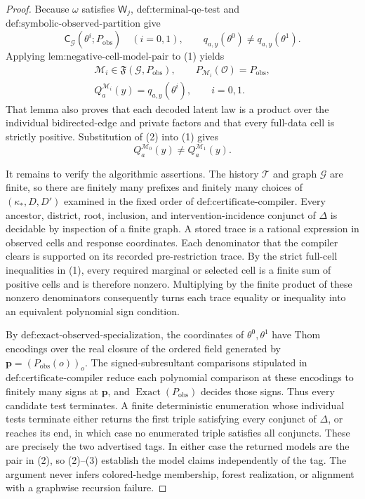 \documentclass{article}
\begin{document}
\begin{proof}
Because \(\omega\) satisfies \(\mathsf W_j\), \(\text{def:terminal-qe-test}\) and \(\text{def:symbolic-observed-partition}\) give
\[
\mathsf C_{\mathcal G}(\theta^i;P_{\mathrm{obs}})
\quad(i=0,1),
\qquad
q_{a,y}(\theta^0)\neq q_{a,y}(\theta^1).
\tag{1}
\]
Applying \(\text{lem:negative-cell-model-pair}\) to (1) yields
\[
\begin{gathered}
\mathcal M_i\in\mathfrak F(\mathcal G,P_{\mathrm{obs}}),
\qquad
P_{\mathcal M_i}(\mathcal O)=P_{\mathrm{obs}},\\
Q_a^{\mathcal M_i}(y)=q_{a,y}(\theta^i),
\qquad i=0,1.
\end{gathered}
\tag{2}
\]
That lemma also proves that each decoded latent law is a product over the individual bidirected-edge and private factors and that every full-data cell is strictly positive.  Substitution of (2) into (1) gives
\[
Q_a^{\mathcal M_0}(y)\neq Q_a^{\mathcal M_1}(y).
\tag{3}
\]

It remains to verify the algorithmic assertions.  The history \(\mathcal T\) and graph \(\mathcal G\) are finite, so there are finitely many prefixes and finitely many choices of \((\kappa_*,D,D')\) examined in the fixed order of \(\text{def:certificate-compiler}\).  Every ancestor, district, root, inclusion, and intervention-incidence conjunct of \(\Delta\) is decidable by inspection of a finite graph.  A stored trace is a rational expression in observed cells and response coordinates.  Each denominator that the compiler clears is supported on its recorded pre-restriction trace.  By the strict full-cell inequalities in (1), every required marginal or selected cell is a finite sum of positive cells and is therefore nonzero.  Multiplying by the finite product of these nonzero denominators consequently turns each trace equality or inequality into an equivalent polynomial sign condition.

By \(\text{def:exact-observed-specialization}\), the coordinates of \(\theta^0,\theta^1\) have Thom encodings over the real closure of the ordered field generated by \(\mathbf p=(P_{\mathrm{obs}}(o))_o\).  The signed-subresultant comparisons stipulated in \(\text{def:certificate-compiler}\) reduce each polynomial comparison at these encodings to finitely many signs at \(\mathbf p\), and \(\operatorname{Exact}(P_{\mathrm{obs}})\) decides those signs.  Thus every candidate test terminates.  A finite deterministic enumeration whose individual tests terminate either returns the first triple satisfying every conjunct of \(\Delta\), or reaches its end, in which case no enumerated triple satisfies all conjuncts.  These are precisely the two advertised tags.  In either case the returned models are the pair in (2), so (2)--(3) establish the model claims independently of the tag.  The argument never infers colored-hedge membership, forest realization, or alignment with a graphwise recursion failure.
\end{proof}
\end{document}
